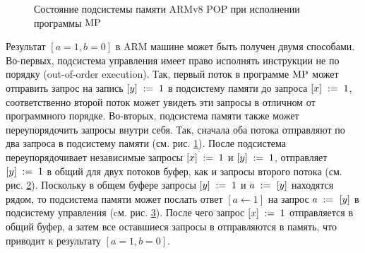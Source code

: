 \begin{figure}

\begin{subfigure}{.33\textwidth}
  \caption{}
  \label{fig:armvpop:mpstorage:1}
\end{subfigure}%
\begin{subfigure}{.33\textwidth}
  \caption{}
  \label{fig:armvpop:mpstorage:2}
\end{subfigure}%
\begin{subfigure}{.33\textwidth}
  \caption{}
  \label{fig:armvpop:mpstorage:3}
\end{subfigure}
\caption{Состояние подсистемы памяти ARMv8 POP при исполнении программы ${\rm MP}$}
\label{fig:armvpop:mpstorage}
\end{figure}

Результат $[a = 1, b = 0]$ в ARM машине может быть получен двумя способами.
Во-первых, подсистема управления имеет право исполнять инструкции не по порядку (out-of-order execution).
Так, первый поток в программе ${\rm MP}$ может отправить запрос на запись $[y]\;:=\;1$ в подсистему памяти до запроса $[x]\;:=\;1$,
соответственно второй поток может увидеть эти запросы в отличном от программного порядке.
Во-вторых, подсистема памяти также может переупорядочить запросы внутри себя.
Так, сначала оба потока отправляют по два запроса в подсистему памяти (см. рис. \ref{fig:armvpop:mpstorage:1}).
После подсистема переупорядочивает независимые запросы $[x]\;:=\;1$ и $[y]\;:=\;1$, отправляет $[y]\;:=\;1$
в общий для двух потоков буфер, как и запросы второго потока (см. рис. \ref{fig:armvpop:mpstorage:2}).
Поскольку в общем буфере запросы $[y]\;:=\;1$ и $a \;:=_{}\;[y]$ находятся рядом, то подсистема памяти может послать
ответ $[a \leftarrow 1]$ на запрос $a \;:=_{}\;[y]$ в подсистему управления (cм. рис. \ref{fig:armvpop:mpstorage:3}).
После чего запрос $[x]\;:=\;1$ отправляется в общий буфер, а затем все оставшиеся запросы в отправляются в память,
что приводит к результату $[a = 1, b = 0]$.

